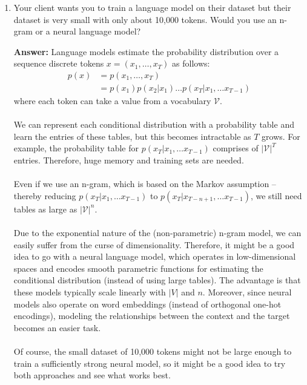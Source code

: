 \documentclass{article}
\newenvironment{QandA}{\begin{enumerate}[label=\arabic*.]}{\end{enumerate}}
\newenvironment{answer}{\par\normalfont \textbf{Answer:}}{}
\newcommand{\g}{\vert}
\begin{document}
\begin{QandA}
    \item Your client wants you to train a language model on their dataset but their dataset is very small with only about 10,000 tokens. Would you use an n-gram or a neural language model?
    \begin{answer}
        Language models estimate the probability distribution over a sequence discrete tokens $x = (x_1, \ldots, x_T)$ as follows:
        \begin{align*}
            p(x) &= p(x_1, \ldots, x_T) \\
            &= p(x_1) p(x_2 \g x_1) \ldots p(x_T \g x_1, \ldots x_{T-1})
        \end{align*}
        where each token can take a value from a vocabulary $\mathcal{V}$.\\\\
        We can represent each conditional distribution with a probability table and learn the entries of these tables, but this becomes intractable as $T$ grows. For example, the probability table for $p(x_T \g x_1, \ldots x_{T-1})$ comprises of $\vert \mathcal{V}\vert^T$ entries. Therefore, huge memory and training sets are needed. \\\\
        Even if we use an n-gram, which is based on the Markov assumption -- thereby reducing $p(x_T \g x_1, \ldots x_{T-1})$ to $p(x_T \g x_{T-n+1}, \ldots x_{T-1})$, we still need tables as large as $\vert \mathcal{V} \vert^n$. \\\\
        Due to the exponential nature of the (non-parametric) n-gram model, we can easily suffer from the curse of dimensionality. Therefore, it might be a good idea to go with a neural language model, which operates in low-dimensional spaces and encodes smooth parametric functions for estimating the conditional distribution (instead of using large tables). The advantage is that these models typically scale linearly with $\vert V \vert$ and $n$. Moreover, since neural models also operate on word embeddings (instead of orthogonal one-hot encodings), modeling the relationships between the context and the target becomes an easier task. \\\\
        Of course, the small dataset of 10,000 tokens might not be large enough to train a sufficiently strong neural model, so it might be a good idea to try both approaches and see what works best.
    \end{answer}


\end{QandA}
\end{document}

